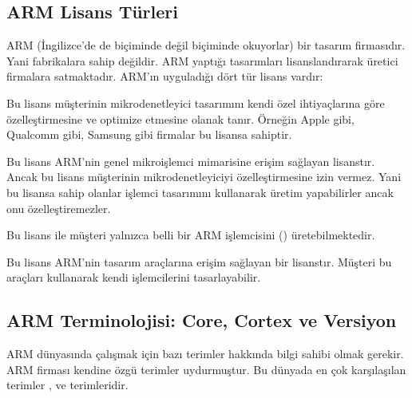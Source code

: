 \documentclass[letterpaper,10pt,turkish]{sphinxmanual}
\begin{document}
\subsection{ARM Lisans Türleri}
\label{\detokenize{introduction:arm-lisans-turleri}}
\sphinxAtStartPar
ARM (İngilizce’de de  biçiminde değil  biçiminde okuyorlar) bir tasarım firmasıdır.
Yani fabrikalara sahip değildir. ARM yaptığı tasarımları lisanslandırarak üretici firmalara
satmaktadır. ARM’ın uyguladığı dört tür lisans vardır:
\begin{description}
\sphinxAtStartPar
Bu lisans müşterinin mikrodenetleyici tasarımını kendi özel ihtiyaçlarına göre özelleştirmesine
ve optimize etmesine olanak tanır. Örneğin Apple gibi, Qualcomm gibi, Samsung gibi firmalar bu
lisansa sahiptir.

\sphinxAtStartPar
Bu lisans ARM’nin genel mikroişlemci mimarisine erişim sağlayan lisanstır. Ancak bu lisans
müşterinin mikrodenetleyiciyi özelleştirmesine izin vermez. Yani bu lisansa sahip olanlar
işlemci tasarımını kullanarak üretim yapabilirler ancak onu özelleştiremezler.

\sphinxAtStartPar
Bu lisans ile müşteri yalnızca belli bir ARM işlemcisini () üretebilmektedir.

\sphinxAtStartPar
Bu lisans ARM’nin tasarım araçlarına erişim sağlayan bir lisanstır. Müşteri bu araçları
kullanarak kendi işlemcilerini tasarlayabilir.

\end{description}


\subsection{ARM Terminolojisi: Core, Cortex ve Versiyon}
\label{\detokenize{introduction:arm-terminolojisi-core-cortex-ve-versiyon}}
\sphinxAtStartPar
ARM dünyasında çalışmak için bazı terimler hakkında bilgi sahibi olmak gerekir. ARM firması
kendine özgü terimler uydurmuştur. Bu dünyada en çok karşılaşılan terimler ,  ve
 terimleridir.
\end{document}
